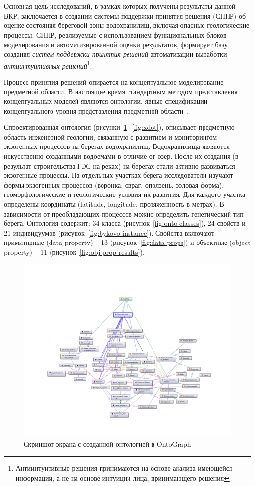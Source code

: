 \documentclass[732,fontsize=14pt,final]{studrep}
\begin{document}
Основная цель исследований, в рамках которых получены результаты данной ВКР, заключается в создании системы поддержки принятия решения (СППР) об оценке состояния береговой зоны водохранилищ, включая опасные геологические процессы. СППР, реализуемые с использованием функциональных блоков моделирования и автоматизированной оценки результатов, формирует базу создания \emph{систем поддержки принятия решений} автоматизации выработки \emph{антиинтуитивных решений}\footnote{Антиинтуитивные решения принимаются на основе анализа имеющейся информации, а не на основе интуиции лица, принимающего решения}.

Процесс принятия решений опирается на концептуальное моделирование предметной области. В настоящее время стандартным методом представления концептуальных моделей являются онтологии, явные спецификации концептуального уровня представления предметной области~\cite{gruber}.

Спроектированная онтология (рисунки~\ref{fig:ontology-graph},~\ref{fig:xdot}), описывает предметную область инженерной геологии, связанную с развитием и мониторингом экзогенных процессов на берегах водохранилищ. Водохранилища являются искусственно созданными водоемами в отличие от озер. После их создания (в результат строительства ГЭС на реках) на берегах стали активно развиваться экзогенные процессы. На отдельных участках берега исследователи изучают формы экзогенных процессов (воронка, овраг, оползень, эоловая форма), геоморфологические и геологические условия их развития. Для каждого участка определены координаты (latitude, longitude, протяженность в метрах). В зависимости от преобладающих процессов можно определить генетический тип берега. Онтология содержит: 34 класса (рисунок~\ref{fig:onto-classes}), 24 свойств и 21 индивидуумов (рисунок~\ref{fig:bykovo-instance}). Свойства включают примитивные (data property) – 13 (рисунок~\ref{fig:data-props}) и объектные (object property) – 11 (рисунок~\ref{fig:obj-prop-results}).

  \begin{figure}[htp]
	\centering
	\includegraphics[width=\linewidth]{pics/image6.png}
    \caption{Скриншот экрана с созданной онтологией в OntoGraph}
    \label{fig:ontology-graph}
  \end{figure}
\end{document}
